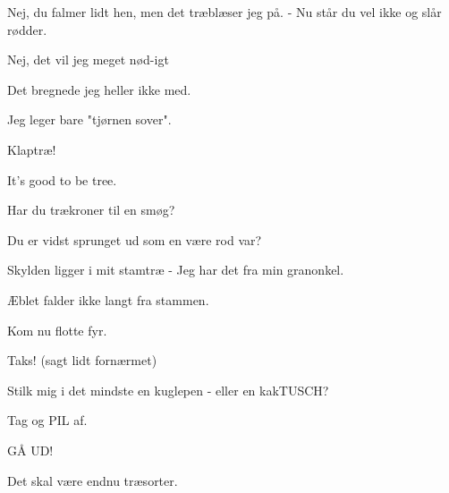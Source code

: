 \documentclass[a4paper,11pt]{article}
\begin{document}
\begin{sketch}
 Nej, du falmer lidt hen, men det træblæser jeg på. - Nu står du vel ikke og slår rødder.

 Nej, det vil jeg meget nød-igt

 Det bregnede jeg heller ikke med.

 Jeg leger bare "tjørnen sover".


 Klaptræ!


 It's good to be tree.

 Har du trækroner til en smøg?

 Du er vidst sprunget ud som en være rod var?

 Skylden ligger i mit stamtræ - Jeg har det fra min granonkel.

 Æblet falder ikke langt fra stammen.

 Kom nu flotte fyr.

 Taks! (sagt lidt fornærmet)

 Stilk mig i det mindste en kuglepen - eller en kakTUSCH?

 Tag og PIL af.


 GÅ UD!


 Det skal være endnu træsorter.


\end{sketch}
\end{document}
